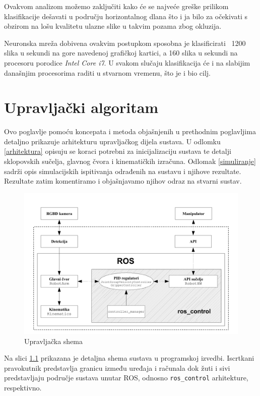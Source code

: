 \documentclass[times, utf8, diplomski, numeric]{fer}
\begin{document}
Ovakvom analizom možemo zaključiti kako će se najveće greške prilikom klasifikacije dešavati u području horizontalnog dlana što i ja bilo za očekivati s obzirom na lošu kvalitetu ulazne slike u takvim pozama zbog okluzija.

Neuronska mreža dobivena ovakvim postupkom sposobna je klasificirati ~1200 slika u sekundi na gore navedenoj grafičkoj kartici, a 160 slika u sekundi na procesoru porodice \textit{Intel Core i7}. U svakom slučaju klasifikacija će i na slabijim današnjim procesorima raditi u stvarnom vremenu, što je i bio cilj.

\chapter{Upravljački algoritam}\label{Upravljački algoritam}
Ovo poglavlje pomoću koncepata i metoda objašnjenih u prethodnim poglavljima detaljno prikazuje arhitekturu upravljačkog dijela sustava.
U odlomku \ref{arhitektura} opisuju se koraci potrebni za inicijalizaciju sustava te detalji sklopovskih sučelja, glavnog čvora i kinematičkih izračuna.
Odlomak \ref{simuliranje} sadrži opis simulacijskih ispitivanja odrađenih na sustavu i njihove rezultate.
Rezultate zatim komentiramo i objašnjavamo njihov odraz na stvarni sustav.

\begin{figure}[h!]
\centering
\includegraphics[width=\textwidth]{upr_shema}
\caption{Upravljačka shema}\label{upr_shm}
\end{figure}

Na slici \ref{upr_shm} prikazana je detaljna shema sustava u programskoj izvedbi.
Iscrtkani pravokutnik predstavlja granicu između uređaja i računala dok žuti i sivi predstavljaju područje sustava unutar ROS, odnosno \texttt{ros\_control} arhitekture, respektivno.
\end{document}
